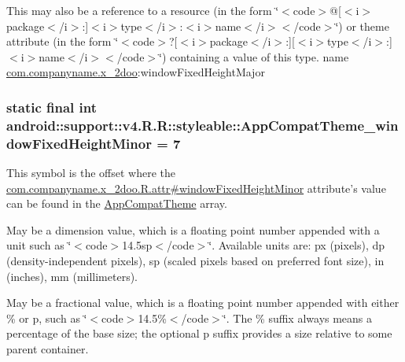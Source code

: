 This may also be a reference to a resource (in the form \char`\"{}$<$code$>$@\mbox{[}$<$i$>$package$<$/i$>$:\mbox{]}$<$i$>$type$<$/i$>$:$<$i$>$name$<$/i$>$$<$/code$>$\char`\"{}) or theme attribute (in the form \char`\"{}$<$code$>$?\mbox{[}$<$i$>$package$<$/i$>$:\mbox{]}\mbox{[}$<$i$>$type$<$/i$>$:\mbox{]}$<$i$>$name$<$/i$>$$<$/code$>$\char`\"{}) containing a value of this type.  name \hyperlink{namespacecom_1_1companyname_1_1x__2doo}{com.companyname.x\_\-2doo}:windowFixedHeightMajor \hypertarget{classandroid_1_1support_1_1v4_1_1_r_1_1styleable_b7b787b3482486bcf6134e26f3f79737}{
\subsubsection[{AppCompatTheme\_\-windowFixedHeightMinor}]{\setlength{\rightskip}{0pt plus 5cm}static final int android::support::v4.R.R::styleable::AppCompatTheme\_\-windowFixedHeightMinor = 7}}
\label{classandroid_1_1support_1_1v4_1_1_r_1_1styleable_b7b787b3482486bcf6134e26f3f79737}


This symbol is the offset where the \hyperlink{classcom_1_1companyname_1_1x__2doo_1_1_r_1_1attr_40bfbc676b211e152760343d6c10e4ff}{com.companyname.x\_\-2doo.R.attr\#windowFixedHeightMinor} attribute's value can be found in the \hyperlink{classandroid_1_1support_1_1v4_1_1_r_1_1styleable_0873e92ba21076bb5a4aeadeb7f5779f}{AppCompatTheme} array.

May be a dimension value, which is a floating point number appended with a unit such as \char`\"{}$<$code$>$14.5sp$<$/code$>$\char`\"{}. Available units are: px (pixels), dp (density-independent pixels), sp (scaled pixels based on preferred font size), in (inches), mm (millimeters). 

May be a fractional value, which is a floating point number appended with either \% or p, such as \char`\"{}$<$code$>$14.5\%$<$/code$>$\char`\"{}. The \% suffix always means a percentage of the base size; the optional p suffix provides a size relative to some parent container. 

